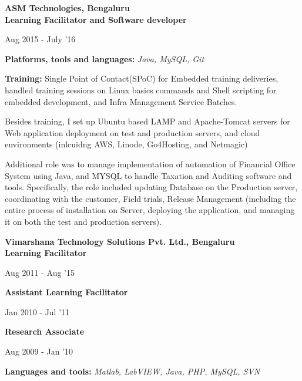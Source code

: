 \documentclass[10pt]{article}
\newenvironment{innerlist}[1][\enskip\textbullet]%
        {\begin{compactitem}[#1]}{\end{compactitem}}
\begin{document}
\textbf{ASM Technologies, Bengaluru} \\ \textbf{Learning Facilitator and Software developer} \\                      
\vspace*{-34pt} \begin{flushright} {Aug 2015 - July '16} \end{flushright}
\vspace*{-2pt} 
\textbf{Platforms, tools and languages:} \emph{Java, MySQL, Git}
\vspace*{2pt}
\begin{innerlist}
\item \textbf{Training:} Single Point of Contact(SPoC) for Embedded training deliveries, handled training sessions on Linux basics commands and Shell scripting for embedded development, and Infra Management Service Batches.
\item	Besides training, I set up Ubuntu based LAMP and Apache-Tomcat servers for Web application deployment on test and production servers, and cloud environments (inlcuidng AWS, Linode, Go4Hosting, and Netmagic)
\item	Additional role was to manage implementation of automation of Financial Office System using Java, and MYSQL to handle Taxation and Auditing software and tools.
\subitem	Specifically, the role included updating Database on the Production server, coordinating with the customer, Field trials, Release Management (including the entire process of installation on Server, deploying the application, and managing it on both the test and production servers).
\end{innerlist}  \vspace*{8pt}

\textbf{Vimarshana Technology Solutions Pvt. Ltd., Bengaluru} \\ \textbf{Learning Facilitator} \\ 
\vspace{-34pt} \begin{flushright} {Aug 2011 - Aug '15} \end{flushright}
\vspace*{-4pt}
\textbf{Assistant Learning Facilitator} \\
\vspace*{-34pt} \begin{flushright} {Jan 2010 - Jul '11} \end{flushright}
\vspace*{-4pt}
\textbf{Research Associate} \\
\vspace*{-36pt} \begin{flushright} {Aug 2009 - Jan '10} \end{flushright}
\vspace*{-2pt} 
\textbf{Languages and tools:} \emph{Matlab, LabVIEW, Java, PHP, MySQL, SVN}
\vspace*{4pt}
\end{document}
